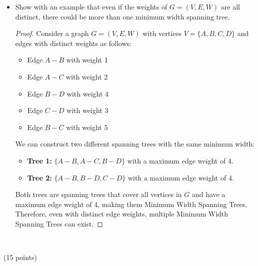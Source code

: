 \documentclass[12pt]{article}
\theoremstyle{plain}
\newcommand{\vs}{\vspace{2mm}}
\begin{document}
\begin{itemize}
    \item[(b)] Show with an example that even if the weights of $G = (V,E,W)$ are all distinct, there could be more than one minimum width spanning tree.
    \begin{proof}
         Consider a graph $G = (V, E, W)$ with vertices $V = \{A, B, C, D\}$ and edges with distinct weights as follows:
        \begin{itemize}
            \item[] Edge $A - B$ with weight 1
            \item[] Edge $A - C$ with weight 2
            \item[] Edge $B - D$ with weight 4
            \item[] Edge $C - D$ with weight 3
            \item[] Edge $B - C$ with weight 5
        \end{itemize}
        
        We can construct two different spanning trees with the same minimum width:
        \begin{itemize}
            \item[] \textbf{Tree 1:} $\{A - B, A - C, B - D\}$ with a maximum edge weight of 4.
            \item[] \textbf{Tree 2:} $\{A - B, B - D, C - D\}$ with a maximum edge weight of 4.
        \end{itemize}
        
        Both trees are spanning trees that cover all vertices in $G$ and have a maximum edge weight of 4, making them Minimum Width Spanning Trees. Therefore, even with distinct edge weights, multiple Minimum Width Spanning Trees can exist.
    \end{proof}
\end{itemize}
\vs\

(15 points)
\vs\
\end{document}
